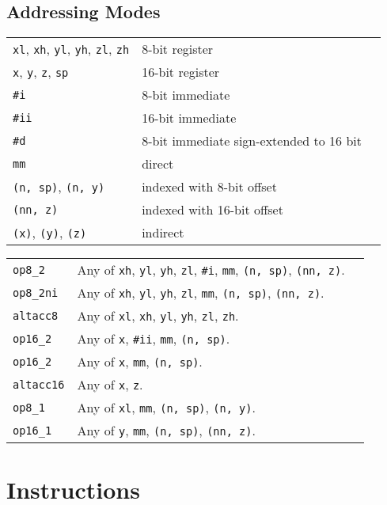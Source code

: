 \documentclass{book}
\begin{document}
\section{Addressing Modes}

\begin{tabular}{l l l}
\texttt{xl}, \texttt{xh}, \texttt{yl}, \texttt{yh}, \texttt{zl}, \texttt{zh} & 8-bit register \\
\texttt{x}, \texttt{y}, \texttt{z}, \texttt{sp} & 16-bit register \\
\texttt{\#i} & 8-bit immediate \\
\texttt{\#ii} & 16-bit immediate \\
\texttt{\#d} & 8-bit immediate sign-extended to 16 bit \\
\texttt{mm} & direct \\
\texttt{(n, sp)}, \texttt{(n, y)} & indexed with 8-bit offset \\
\texttt{(nn, z)} & indexed with 16-bit offset \\
\texttt{(x)}, \texttt{(y)}, \texttt{(z)} & indirect
\end{tabular}



\begin{tabular}{l l l}
\texttt{op8\_2} & Any of \texttt{xh}, \texttt{yl}, \texttt{yh}, \texttt{zl}, \texttt{\#i}, \texttt{mm}, \texttt{(n, sp)}, \texttt{(nn, z)}. \\
\texttt{op8\_2ni} & Any of \texttt{xh}, \texttt{yl}, \texttt{yh}, \texttt{zl}, \texttt{mm}, \texttt{(n, sp)}, \texttt{(nn, z)}. \\
\texttt{altacc8} & Any of \texttt{xl}, \texttt{xh}, \texttt{yl}, \texttt{yh}, \texttt{zl}, \texttt{zh}. \\
\texttt{op16\_2} & Any of \texttt{x}, \texttt{\#ii}, \texttt{mm}, \texttt{(n, sp)}. \\
\texttt{op16\_2} & Any of \texttt{x}, \texttt{mm}, \texttt{(n, sp)}. \\
\texttt{altacc16} & Any of \texttt{x}, \texttt{z}. \\
\texttt{op8\_1} & Any of \texttt{xl}, \texttt{mm}, \texttt{(n, sp)}, \texttt{(n, y)}. \\
\texttt{op16\_1} & Any of \texttt{y}, \texttt{mm}, \texttt{(n, sp)}, \texttt{(nn, z)}. \\
\end{tabular}

\chapter{Instructions}
\end{document}
